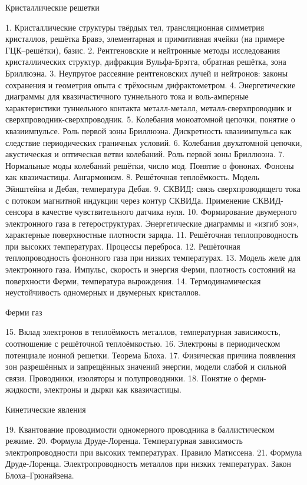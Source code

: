 Кристаллические решетки

1. Кристаллические структуры твёрдых тел, трансляционная симметрия кристаллов, решётка Бравэ, элементарная и примитивная ячейки (на примере ГЦК--решётки), базис.
2. Рентгеновские и нейтронные методы исследования кристаллических структур, дифракция Вульфа-Брэгга, обратная решётка, зона Бриллюэна.
3. Неупругое рассеяние рентгеновских лучей и нейтронов: законы сохранения и геометрия опыта с трёхосным дифрактометром.
4. Энергетические диаграммы для квазичастичного туннельного тока и воль-амперные характеристики туннельного контакта металл-металл, металл-сверхпроводник и сверхпроводник-сверхпроводник.
5. Колебания моноатомной цепочки, понятие о квазиимпульсе. Роль первой зоны Бриллюэна. Дискретность квазиимпульса как следствие периодических граничных условий.
6. Колебания двухатомной цепочки, акустическая и оптическая ветви колебаний. Роль первой зоны Бриллюэна.
7. Нормальные моды колебаний решётки, число мод. Понятие о фононах. Фононы как квазичастицы. Ангармонизм.
8. Решёточная теплоёмкость. Модель Эйнштейна и Дебая, температура Дебая.
9. СКВИД: связь сверхпроводящего тока с потоком магнитной индукции через контур СКВИДа. Применение СКВИД-сенсора в качестве чувствительного датчика нуля.
10. Формирование двумерного электронного газа в гетероструктурах. Энергетические диаграммы и «изгиб зон», характерные поверхностные плотности заряда.
11. Решёточная теплопроводность при высоких температурах. Процессы переброса.
12. Решёточная теплопроводность фононного газа при низких температурах.
13. Модель желе для электронного газа. Импульс, скорость и энергия Ферми, плотность состояний на поверхности Ферми, температура вырождения.
14. Термодинамическая неустойчивость одномерных и двумерных кристаллов.


Ферми газ

15. Вклад электронов в теплоёмкость металлов, температурная зависимость, соотношение с решёточной теплоёмкостью.
16. Электроны в периодическом потенциале ионной решетки. Теорема Блоха.
17. Физическая причина появления зон разрешённых и запрещённых значений энергии, модели слабой и сильной связи. Проводники, изоляторы и полупроводники.
18. Понятие о ферми-жидкости, электроны и дырки как квазичастицы.



Кинетические явления

19. Квантование проводимости одномерного проводника в баллистическом режиме.
20. Формула Друде-Лоренца. Температурная зависимость электропроводности при высоких температурах. Правило Матиссена.
21. Формула Друде-Лоренца. Электропроводность металлов при низких температурах. Закон Блоха--Грюнайзена.



